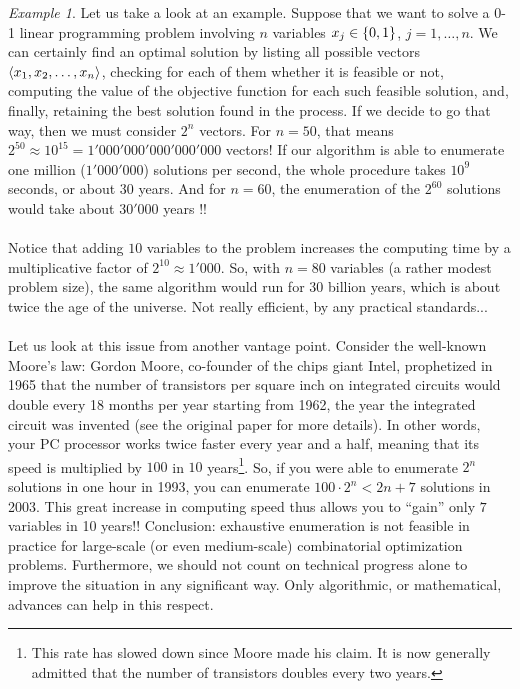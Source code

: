 \documentclass[titlepage]{book}
\theoremstyle{plain}
\theoremstyle{definition}
\theoremstyle{remark}
\newtheorem{example}{Example}
\begin{document}
\begin{example}
Let us take a look at an example. Suppose that we want to solve a 0-1 linear programming problem involving $n$ variables $x_j\in\left\{ 0,1 \right\}$, $j=1,\ldots,n$. We can certainly find an optimal solution by listing all possible vectors $\left\langle x_1,x_2,\ldots,x_n \right\rangle$, checking for each of them whether it is feasible or not, computing the value of the objective function for each such feasible solution, and, finally, retaining the best solution found in the process. If we decide to go that way, then we must consider $2^n$ vectors. For $n=50$, that means $2^{50}\approx 10^{15}=1'000'000'000'000'000$ vectors! If our algorithm is able to enumerate one million ($1'000'000$) solutions per second, the whole procedure takes $10^9$ seconds, or about $30$ years. And for $n=60$, the enumeration of the $2^{60}$ solutions would take about $30'000$ years !!

\paragraph{}
Notice that adding $10$ variables to the problem increases the computing time by a multiplicative factor of $2^{10}\approx1'000$. So, with $n=80$ variables (a rather modest problem size), the same algorithm would run for $30$ billion years, which is about twice the age of the universe. Not really efficient, by any practical standards...
\end{example}

\paragraph{}
Let us look at this issue from another vantage point. Consider the well-known Moore's law: Gordon Moore, co-founder of the chips giant Intel, prophetized in 1965 that the number of transistors per square inch on integrated circuits would double every 18 months per year starting from 1962, the year the integrated circuit was invented (see the original paper for more details). In other words, your PC processor works twice faster every year and a half, meaning that its speed is multiplied by $100$ in $10$ years\footnote{This rate has slowed down since Moore made his claim. It is now generally admitted that the number of transistors doubles every two years.}. So, if you were able to enumerate $2^n$ solutions in one hour in 1993, you can enumerate $100\cdot2^n<2{n+7}$ solutions in 2003. This great increase in computing speed thus allows you to ``gain'' only $7$ variables in 10 years!! Conclusion: exhaustive enumeration is not feasible in practice for large-scale (or even medium-scale) combinatorial optimization problems. Furthermore, we should not count on technical progress alone to improve the situation in any significant way. Only algorithmic, or mathematical, advances can help in this respect.
\end{document}
